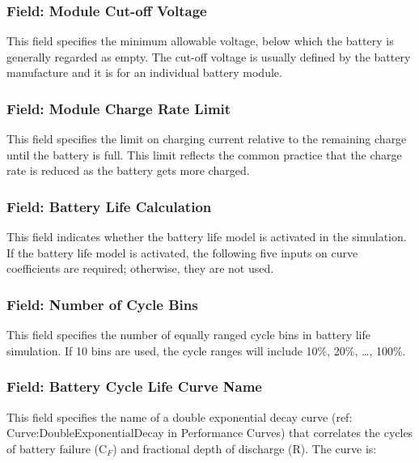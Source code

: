 \subsubsection{Field: Module Cut-off Voltage}\label{field-module-cut-off-voltage}

This field specifies the minimum allowable voltage, below which the battery is generally regarded as empty. The cut-off voltage is usually defined by the battery manufacture and it is for an individual battery module.

\subsubsection{Field: Module Charge Rate Limit}\label{field-module-charge-rate-limit}

This field specifies the limit on charging current relative to the remaining charge until the battery is full. This limit reflects the common practice that the charge rate is reduced as the battery gets more charged.

\subsubsection{Field: Battery Life Calculation}\label{field-battery-life-calculation}

This field indicates whether the battery life model is activated in the simulation. If the battery life model is activated, the following five inputs on curve coefficients are required; otherwise, they are not used.

\subsubsection{Field: Number of Cycle Bins}\label{field-number-of-cycle-bins}

This field specifies the number of equally ranged cycle bins in battery life simulation. If 10 bins are used, the cycle ranges will include 10\%, 20\%, \ldots{}, 100\%.

\subsubsection{Field: Battery Cycle Life Curve Name}\label{field-battery-cycle-life-curve-name}

This field specifies the name of a double exponential decay curve (ref: Curve:DoubleExponentialDecay in Performance Curves) that correlates the cycles of battery failure (C\(_{F}\)) and fractional depth of discharge (R). The curve is:

